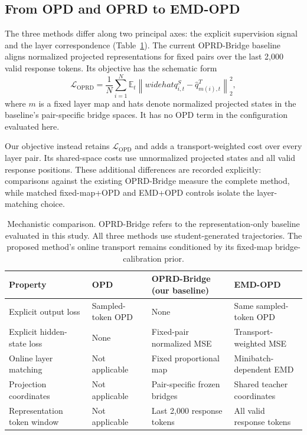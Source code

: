 \documentclass[10pt,twocolumn]{article}
\newcommand{\method}{\textsc{EMD-OPD}}
\begin{document}
\subsection{From OPD and OPRD to EMD-OPD}

The three methods differ along two principal axes: the explicit supervision signal and the layer correspondence (Table~\ref{tab:method_comparison}). The current OPRD-Bridge baseline aligns normalized projected representations for fixed pairs over the last 2,000 valid response tokens. Its objective has the schematic form
\begin{equation}
\mathcal{L}_{\mathrm{OPRD}}=
\frac{1}{N}\sum_{i=1}^{N}
\mathbb{E}_{t}\left\|widehat{q}^S_{i,t}
-\widehat{q}^T_{m(i),t}\right\|_2^2,
\end{equation}
where $m$ is a fixed layer map and hats denote normalized projected states in the baseline's pair-specific bridge spaces. It has no OPD term in the configuration evaluated here.

Our objective instead retains $\mathcal{L}_{\mathrm{OPD}}$ and adds a transport-weighted cost over every layer pair. Its shared-space costs use unnormalized projected states and all valid response positions. These additional differences are recorded explicitly: comparisons against the existing OPRD-Bridge measure the complete method, while matched fixed-map+OPD and EMD+OPD controls isolate the layer-matching choice.

\begin{table}[t]
\centering
\small
\caption{Mechanistic comparison. OPRD-Bridge refers to the representation-only baseline evaluated in this study. All three methods use student-generated trajectories. The proposed method's online transport remains conditioned by its fixed-map bridge-calibration prior.}
\label{tab:method_comparison}
\begin{tabular}{@{}llll@{}}
\toprule
Property & OPD & OPRD-Bridge (our baseline) & \method{} \\
\midrule
Explicit output loss & Sampled-token OPD & None & Same sampled-token OPD \\
Explicit hidden-state loss & None & Fixed-pair normalized MSE & Transport-weighted MSE \\
Online layer matching & Not applicable & Fixed proportional map & Minibatch-dependent EMD \\
Projection coordinates & Not applicable & Pair-specific frozen bridges & Shared teacher coordinates \\
Representation token window & Not applicable & Last 2,000 response tokens & All valid response tokens \\
\bottomrule
\end{tabular}
\end{table}
\end{document}
